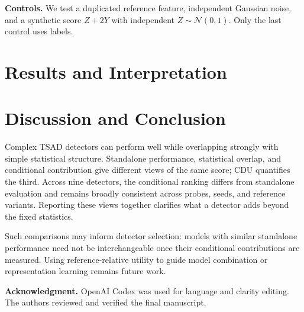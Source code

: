\textbf{Controls.} We test a duplicated reference feature, independent Gaussian noise, and a synthetic score $Z+2Y$ with independent $Z\sim\mathcal N(0,1)$. Only the last control uses labels.

\section{Results and Interpretation}


\section{Discussion and Conclusion}
Complex TSAD detectors can perform well while overlapping strongly with simple statistical structure. Standalone performance, statistical overlap, and conditional contribution give different views of the same score; CDU quantifies the third. Across nine detectors, the conditional ranking differs from standalone evaluation and remains broadly consistent across probes, seeds, and reference variants. Reporting these views together clarifies what a detector adds beyond the fixed statistics.

Such comparisons may inform detector selection: models with similar standalone performance need not be interchangeable once their conditional contributions are measured. Using reference-relative utility to guide model combination or representation learning remains future work.

{\footnotesize\noindent\textbf{Acknowledgment.} OpenAI Codex was used for language and clarity editing. The authors reviewed and verified the final manuscript.\par}
